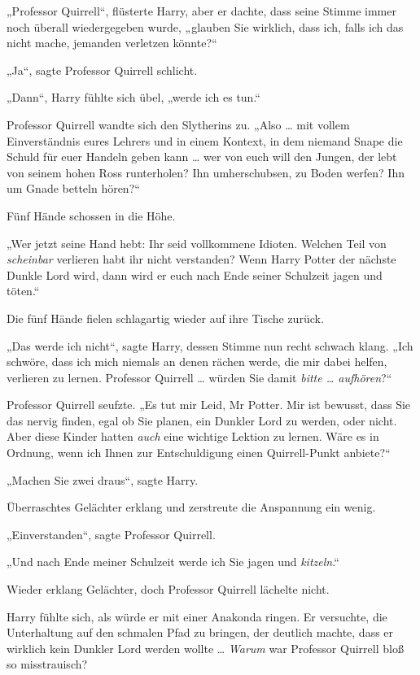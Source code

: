 {„Professor Quirrell“, flüsterte Harry, aber er dachte, dass seine Stimme immer noch überall wiedergegeben wurde, „glauben Sie wirklich, dass ich, falls ich das nicht mache, jemanden verletzen könnte?“

„Ja“, sagte Professor Quirrell schlicht.

„Dann“, Harry fühlte sich übel, „werde ich es tun.“

Professor Quirrell wandte sich den Slytherins zu. „Also … mit vollem Einverständnis eures Lehrers und in einem Kontext, in dem niemand Snape die Schuld für euer Handeln geben kann … wer von euch will den Jungen, der lebt von seinem hohen Ross runterholen? Ihn umherschubsen, zu Boden werfen? Ihn um Gnade betteln hören?“

Fünf Hände schossen in die Höhe.

„Wer jetzt seine Hand hebt: Ihr seid vollkommene Idioten. Welchen Teil von \emph{scheinbar} verlieren habt ihr nicht verstanden? Wenn Harry Potter der nächste Dunkle Lord wird, dann wird er euch nach Ende seiner Schulzeit jagen und töten.“

Die fünf Hände fielen schlagartig wieder auf ihre Tische zurück.

„Das werde ich nicht“, sagte Harry, dessen Stimme nun recht schwach klang. „Ich schwöre, dass ich mich niemals an denen rächen werde, die mir dabei helfen, verlieren zu lernen. Professor Quirrell … würden Sie damit \emph{bitte … aufhören}?“

Professor Quirrell seufzte. „Es tut mir Leid, Mr Potter. Mir ist bewusst, dass Sie das nervig finden, egal ob Sie planen, ein Dunkler Lord zu werden, oder nicht. Aber diese Kinder hatten \emph{auch} eine wichtige Lektion zu lernen. Wäre es in Ordnung, wenn ich Ihnen zur Entschuldigung einen Quirrell-Punkt anbiete?“

„Machen Sie zwei draus“, sagte Harry.

Überraschtes Gelächter erklang und zerstreute die Anspannung ein wenig.

„Einverstanden“, sagte Professor Quirrell.

„Und nach Ende meiner Schulzeit werde ich Sie jagen und \emph{kitzeln}.“

Wieder erklang Gelächter, doch Professor Quirrell lächelte nicht.

Harry fühlte sich, als würde er mit einer Anakonda ringen. Er versuchte, die Unterhaltung auf den schmalen Pfad zu bringen, der deutlich machte, dass er wirklich kein Dunkler Lord werden wollte … \emph{Warum} war Professor Quirrell bloß so misstrauisch?

}
